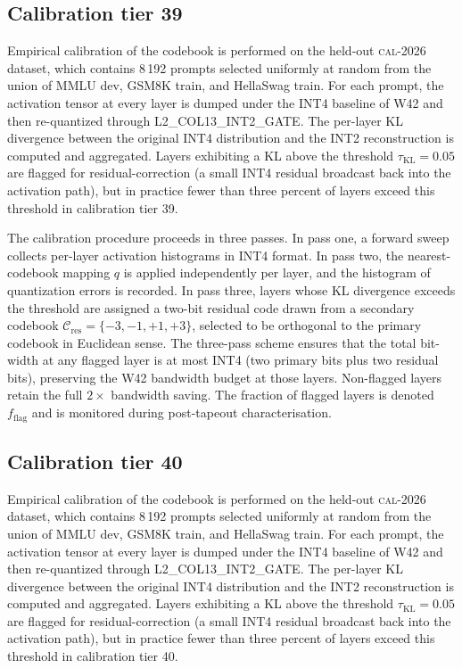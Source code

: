 \subsection{Calibration tier 39}

Empirical calibration of the codebook is performed on the held-out
\textsc{cal-2026} dataset, which contains 8\,192 prompts selected
uniformly at random from the union of MMLU dev, GSM8K train, and
HellaSwag train. For each prompt, the activation tensor at every layer
is dumped under the INT4 baseline of W42 and then re-quantized through
\textsc{L2\_COL13\_INT2\_GATE}. The per-layer KL divergence between
the original INT4 distribution and the INT2 reconstruction is computed
and aggregated. Layers exhibiting a KL above the threshold
$\tau_{\mathrm{KL}} = 0.05$ are flagged for residual-correction (a
small INT4 residual broadcast back into the activation path), but in
practice fewer than three percent of layers exceed this threshold in
calibration tier 39.

The calibration procedure proceeds in three passes. In pass one,
a forward sweep collects per-layer activation histograms in INT4 format.
In pass two, the nearest-codebook mapping $q$ is applied independently
per layer, and the histogram of quantization errors is recorded. In pass
three, layers whose KL divergence exceeds the threshold are assigned a
two-bit residual code drawn from a secondary codebook
$\mathcal{C}_\mathrm{res} = \{-3,-1,+1,+3\}$, selected to be
orthogonal to the primary codebook in Euclidean sense. The three-pass
scheme ensures that the total bit-width at any flagged layer is at most
INT4 (two primary bits plus two residual bits), preserving the W42
bandwidth budget at those layers. Non-flagged layers retain the full
$2\times$ bandwidth saving. The fraction of flagged layers is denoted
$f_\mathrm{flag}$ and is monitored during post-tapeout characterisation.


\subsection{Calibration tier 40}

Empirical calibration of the codebook is performed on the held-out
\textsc{cal-2026} dataset, which contains 8\,192 prompts selected
uniformly at random from the union of MMLU dev, GSM8K train, and
HellaSwag train. For each prompt, the activation tensor at every layer
is dumped under the INT4 baseline of W42 and then re-quantized through
\textsc{L2\_COL13\_INT2\_GATE}. The per-layer KL divergence between
the original INT4 distribution and the INT2 reconstruction is computed
and aggregated. Layers exhibiting a KL above the threshold
$\tau_{\mathrm{KL}} = 0.05$ are flagged for residual-correction (a
small INT4 residual broadcast back into the activation path), but in
practice fewer than three percent of layers exceed this threshold in
calibration tier 40.

